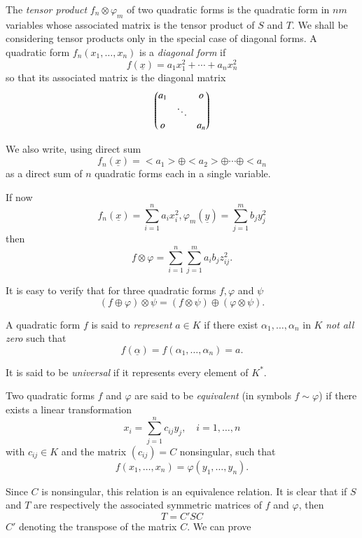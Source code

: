 The \textit{tensor product} $f_n \otimes \varphi_m$ of two quadratic
forms is the quadratic form in $nm$ variables whose associated matrix
is the tensor product of $S$ and $T$. We shall be considering tensor
products only in the special case of diagonal forms. A quadratic form
$f_n(x_1,\ldots,x_n)$ is a \textit{diagonal form} if 
$$
f(\underline{x})=a_1x^{2}_1+\cdots + a_n x^{2}_n
$$
so that its associated matrix is the diagonal matrix
\begin{equation*}
\begin{pmatrix}
a_1 & & o\\
& \ddots &\\
o & & a_n 
\end{pmatrix}
\end{equation*}

We also write, using direct sum
\begin{equation}\label{eqn2}
f_n(\underline{x}) = <a_1> \oplus <a_2> \oplus\cdots \oplus < a_n
\end{equation}
as a direct sum of  $n$ quadratic forms each in a single variable.

If now 
$$
f_n(\underline{x})= \sum\limits_{i=1}^{n} a_ix^{2}_i, \varphi_m
(\underline{y})=\sum\limits _{j=1}^{m} b_jy^{2}_j
$$
then
\begin{equation}\label{eqn3}
f\otimes \varphi= \sum\limits_{i=1}^{n}\sum\limits_{j=1}^{m}a_i b_j z^{2}_{ij}.
\end{equation}

It is easy to verify that for three quadratic forms $f, \varphi$ and
$\psi$
\begin{equation}\label{eqn4}
(f\oplus \varphi)\otimes \psi = (f\otimes \psi) \oplus (\varphi
  \otimes \psi).
\end{equation}

A quadratic form $f$ is said to \textit{represent} $a\in K$ if
there exist $\alpha_1,\ldots,\alpha_n$ in $K$ \textit{not all zero}
such that
$$
f(\underline{\alpha})=f(\alpha_1,\ldots,\alpha_n)=a.
$$

It is said to be \textit{universal} if it represents every element of
$K^{\ast}$. 

Two quadratic forms $f$ and $\varphi$ are said to be
\textit{equivalent} (in symbols $f\sim\varphi$) if there exists a
linear transformation
$$
x_i=\sum\limits_{j=1}^{n} c_{ij}y_j, \quad i=1,\ldots,n
$$
with $c_{ij}\in K$ and the matrix $(c_{ij})=C$ nonsingular, such
that 
$$
f(x_1,\ldots,x_n)= \varphi(y_1,\ldots,y_n).
$$

Since $C$ is nonsingular, this relation is an equivalence relation. It
is clear that if $S$ and $T$ are respectively the associated
symmetric matrices of $f$ and $\varphi$, then
\begin{equation}\label{eqn5}
T=C'SC
\end{equation}
$C'$ denoting the transpose of the matrix $C$. We can prove

